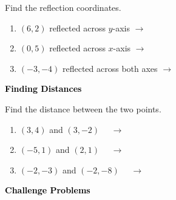 \documentclass[12pt, letterpaper, fleqn]{article}
\newcommand{\blank}{\underline{\hspace{2.2cm}}}
\begin{document}
\noindent
Find the reflection coordinates.

\vspace{3mm}
\begin{enumerate}[itemsep=2.2cm, leftmargin=0.6cm]
\item $(6, 2)$ reflected across $y$-axis $\rightarrow$ \blank

\vspace{2cm}

\item $(0, 5)$ reflected across $x$-axis $\rightarrow$ \blank

\vspace{2cm}

\item $(-3, -4)$ reflected across both axes $\rightarrow$ \blank

\vspace{2cm}

\end{enumerate}

\newpage

\begin{tcolorbox}[colback=black!10]
\large\textcolor{black}{\textbf{Finding Distances}}
\end{tcolorbox}

\noindent
Find the distance between the two points.

\vspace{3mm}
\begin{enumerate}[itemsep=2.3cm, leftmargin=0.6cm]
\item $(3, 4)$ and $(3, -2)$ $\quad\rightarrow\quad$ \blank

\vspace{2.2cm}

\item $(-5, 1)$ and $(2, 1)$ $\quad\rightarrow\quad$ \blank

\vspace{2.2cm}

\item $(-2, -3)$ and $(-2, -8)$ $\quad\rightarrow\quad$ \blank

\vspace{2.2cm}

\end{enumerate}

\newpage

\begin{tcolorbox}[colback=black!10]
\large\textcolor{black}{\textbf{Challenge Problems}}
\end{tcolorbox}
\end{document}
